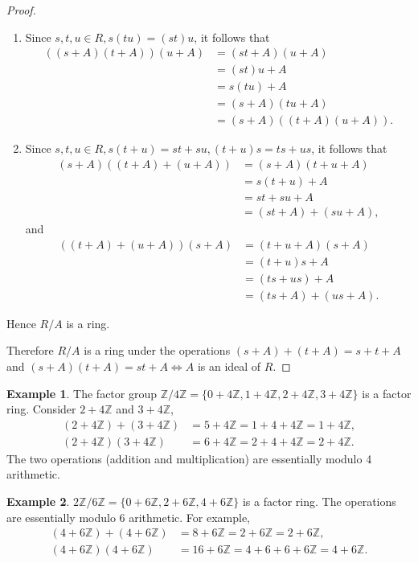 \documentclass{article}
\theoremstyle{definition}
\newtheorem{example}{Example}[section]
\begin{document}
\begin{proof}
\begin{enumerate}
         \item Since $s,t,u \in R, s(tu)=(st)u$, it follows that
         \begin{align*}
             ((s+A)(t+A))(u+A)&=(st+A)(u+A)\\
             &=(st)u+A\\
             &=s(tu)+A\\
             &=(s+A)(tu+A)\\
             &=(s+A)((t+A)(u+A)).
         \end{align*}
         
         \item Since $s,t,u\in R, s(t+u)=st+su, (t+u)s=ts+us$, it follows that
         \begin{align*}
             (s+A)((t+A)+(u+A))&=(s+A)(t+u+A)\\
             &=s(t+u)+A\\
             &=st+su+A\\
             &=(st+A)+(su+A),
         \end{align*}
         and
         \begin{align*}
             ((t+A)+(u+A))(s+A)&=(t+u+A)(s+A)\\
             &=(t+u)s+A\\
             &=(ts+us)+A\\
             &=(ts+A)+(us+A).
         \end{align*}
     \end{enumerate}
     Hence $R/A$ is a ring.
     
     Therefore $R/A$ is a ring under the operations $(s+A)+(t+A)=s+t+A$ and $(s+A)(t+A)=st+A \iff A$ is an ideal of $R$.
\end{proof}

\begin{example}
    The factor group $\mathbb{Z}/4\mathbb{Z}=\{0+4\mathbb{Z}, 1+4\mathbb{Z}, 2+4\mathbb{Z}, 3+4\mathbb{Z}\}$ is a factor ring. Consider $2+4\mathbb{Z}$ and $3+4\mathbb{Z}$,
    \begin{align*}
        (2+4\mathbb{Z})+(3+4\mathbb{Z})&=5+4\mathbb{Z}=1+4+4\mathbb{Z}=1+4\mathbb{Z},\\
        (2+4\mathbb{Z})(3+4\mathbb{Z})&=6+4\mathbb{Z}=2+4+4\mathbb{Z}=2+4\mathbb{Z}.
    \end{align*}
    The two operations (addition and multiplication) are essentially modulo 4 arithmetic.
\end{example}

\begin{example}
    $2\mathbb{Z}/6\mathbb{Z}=\{0+6\mathbb{Z}, 2+6\mathbb{Z}, 4+6\mathbb{Z}\}$ is a factor ring. The operations are essentially modulo 6 arithmetic. For example,
    \begin{align*}
        (4+6\mathbb{Z})+(4+6\mathbb{Z})&=8+6\mathbb{Z}=2+6\mathbb{Z}=2+6\mathbb{Z},\\
        (4+6\mathbb{Z})(4+6\mathbb{Z})&=16+6\mathbb{Z}=4+6+6+6\mathbb{Z}=4+6\mathbb{Z}.
    \end{align*}
\end{example}
\end{document}
